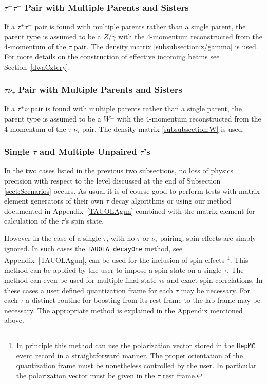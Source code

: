 \documentclass[]{Tauola_interface_design}
\begin{document}
\subsubsection{$\tau^+ \tau^-$ Pair with Multiple Parents and Sisters}
If a $\tau^+ \tau^-$ pair is found with multiple parents rather
than a single parent, the parent type is assumed to be a
$Z/\gamma$ with the 4-momentum  reconstructed from
the 4-momentum of the $\tau$ pair. The density matrix  
\ref{subsubsection:z/gamma} is used. For more details on the construction
of effective incoming beams see  Section~\ref{dwaCztery}.

\subsubsection{$\tau \nu_{\tau}$ Pair with Multiple Parents and Sisters}
If a $\tau^+ \nu$ pair is found with multiple parents rather
than a single parent, the parent type is assumed to be a
$W^{\pm}$ with the 4-momentum  reconstructed from 
the 4-momentum of the $\tau\; \nu_\tau$ pair. The density matrix 
\ref{subsubsection:W} is used. 

\subsubsection{Single $\tau$ and Multiple Unpaired $\tau$'s}

In the two cases listed in the previous two subsections, no loss of physics precision with respect to  the level discussed at the 
end of Subsection \ref{sect:Scenarios}  occurs. As usual it is of course good
to perform
tests with matrix element generators of their own $\tau$ decay algorithms 
or using our method documented in Appendix~\ref{TAUOLAgun} combined with 
the matrix element 
for calculation of the $\tau$'s spin state. 

However in the case of a single $\tau$, with no $\tau$ or $\nu_{\tau}$ pairing, 
spin effects are simply ignored. In such cases the {\tt TAUOLA decayOne} method,
see Appendix~\ref{TAUOLAgun}, can be used for the inclusion of spin effects%
\footnote{In principle this method can use the polarization vector stored in the {\tt HepMC} event
 record in a straightforward manner. The proper orientation of the quantization frame
 must be nonetheless controlled by the user. In particular the polarization vector must 
be given  in the $\tau$ rest frame. }.
This method can be applied
by the user to impose a spin state on a single $\tau$. The method can even be used for 
multiple final state $\tau$s and exact spin correlations.
In these cases a user defined quantization frame for each  $\tau$ may be necessary. For each $\tau$ a distinct routine for boosting from its rest-frame to the lab-frame
may be necessary. The appropriate method is explained in the Appendix mentioned above.
\end{document}
